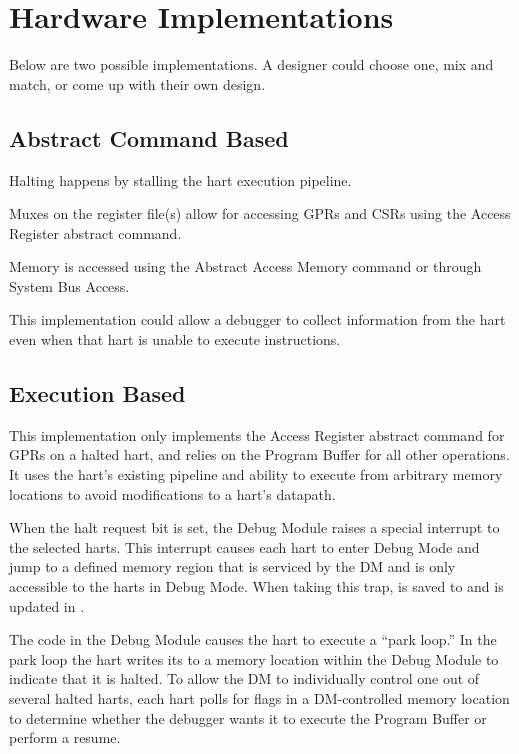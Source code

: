 \chapter{Hardware Implementations}
\label{sec:implementations}

Below are two possible implementations. A designer could choose one, mix and
match, or come up with their own design.

\section{Abstract Command Based}

Halting happens by stalling the hart execution pipeline.

Muxes on the register file(s) allow for accessing GPRs and CSRs
using the Access Register abstract command.

Memory is accessed using the Abstract Access Memory command or through System
Bus Access.

This implementation could allow a debugger to collect information from the hart
even when that hart is unable to execute instructions.

\section{Execution Based} \label{execution_based}

This implementation only implements the Access Register abstract command
for GPRs on a halted hart, and relies on the Program Buffer for all other
operations.
It uses the hart's existing pipeline
and ability to execute from arbitrary memory locations to avoid
modifications to a hart's datapath.

When the halt request bit is set, the Debug Module raises a special interrupt
to the selected harts. This interrupt causes each
hart to enter Debug Mode and jump to a defined
memory region that is serviced by the DM and is only accessible to the harts in Debug Mode.
When taking this trap, \Rpc is saved to \RcsrDpc and \FcsrDcsrCause is updated
in \RcsrDcsr.

The code in the Debug Module causes the hart to execute a ``park loop.''
In the park loop the hart writes its \Rmhartid to a
memory location within the Debug Module to indicate that it is halted.
To allow the DM to individually control one out of several
halted harts, each hart polls for flags in a DM-controlled memory location
to determine whether the debugger wants it to
execute the Program Buffer or perform a resume.

